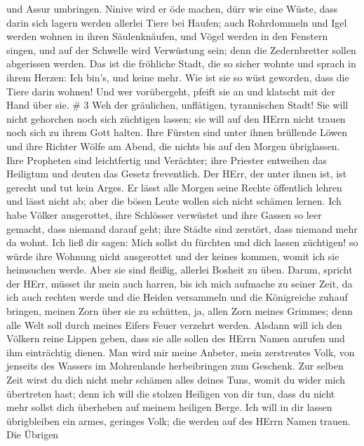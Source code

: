 und Assur umbringen. Ninive wird er öde machen, dürr wie eine Wüste,
 dass darin sich lagern werden allerlei Tiere bei Haufen;
auch Rohrdommeln und Igel werden wohnen in ihren Säulenknäufen, und
Vögel werden in den Fenstern singen, und auf der Schwelle wird
Verwüstung sein; denn die Zedernbretter sollen abgerissen werden.
 Das ist die fröhliche Stadt, die so sicher wohnte und
sprach in ihrem Herzen: Ich bin's, und keine mehr. Wie ist sie so wüst
geworden, dass die Tiere darin wohnen! Und wer vorübergeht, pfeift sie
an und klatscht mit der Hand über sie. \# 3  Weh der
gräulichen, unflätigen, tyrannischen Stadt!  Sie will nicht
gehorchen noch sich züchtigen lassen; sie will auf den HErrn nicht
trauen noch sich zu ihrem Gott halten.  Ihre Fürsten sind
unter ihnen brüllende Löwen und ihre Richter Wölfe am Abend, die nichts
bis auf den Morgen übriglassen.  Ihre Propheten sind
leichtfertig und Verächter; ihre Priester entweihen das Heiligtum und
deuten das Gesetz freventlich.  Der HErr, der unter ihnen
ist, ist gerecht und tut kein Arges. Er lässt alle Morgen seine Rechte
öffentlich lehren und lässt nicht ab; aber die bösen Leute wollen sich
nicht schämen lernen.  Ich habe Völker ausgerottet, ihre
Schlösser verwüstet und ihre Gassen so leer gemacht, dass niemand darauf
geht; ihre Städte sind zerstört, dass niemand mehr da wohnt.
 Ich ließ dir sagen: Mich sollst du fürchten und dich lassen
züchtigen! so würde ihre Wohnung nicht ausgerottet und der keines
kommen, womit ich sie heimsuchen werde. Aber sie sind fleißig, allerlei
Bosheit zu üben.  Darum, spricht der HErr, müsset ihr mein
auch harren, bis ich mich aufmache zu seiner Zeit, da ich auch rechten
werde und die Heiden versammeln und die Königreiche zuhauf bringen,
meinen Zorn über sie zu schütten, ja, allen Zorn meines Grimmes; denn
alle Welt soll durch meines Eifers Feuer verzehrt werden. 
Alsdann will ich den Völkern reine Lippen geben, dass sie alle sollen
des HErrn Namen anrufen und ihm einträchtig dienen.  Man
wird mir meine Anbeter, mein zerstreutes Volk, von jenseits des Wassers
im Mohrenlande herbeibringen zum Geschenk.  Zur selben Zeit
wirst du dich nicht mehr schämen alles deines Tuns, womit du wider mich
übertreten hast; denn ich will die stolzen Heiligen von dir tun, dass du
nicht mehr sollst dich überheben auf meinem heiligen Berge.
 Ich will in dir lassen übrigbleiben ein armes, geringes
Volk; die werden auf des HErrn Namen trauen.  Die Übrigen
